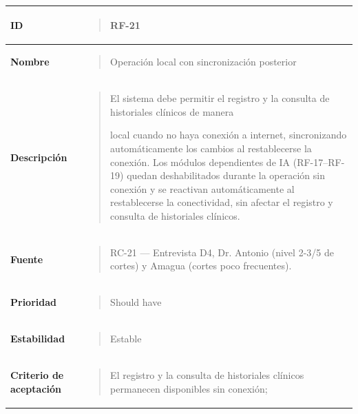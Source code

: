 \documentclass[
]{article}
\newcounter{none} %
\begin{document}
{\def\LTcaptype{none} %
\begin{longtable}[]{@{}
  >{\raggedright\arraybackslash}p{}
  >{\raggedright\arraybackslash}p{}@{}}
\toprule\noalign{}
\begin{minipage}[b]{\linewidth}\raggedright
\textbf{ID}
\end{minipage} & \begin{minipage}[b]{\linewidth}\raggedright
\begin{quote}
RF-21
\end{quote}
\end{minipage} \\
\midrule\noalign{}
\endhead
\bottomrule\noalign{}
\endlastfoot
\textbf{Nombre} & \begin{minipage}[t]{\linewidth}\raggedright
\begin{quote}
Operación local con sincronización posterior
\end{quote}
\end{minipage} \\
\textbf{Descripción} & \begin{minipage}[t]{\linewidth}\raggedright
\begin{quote}
El sistema debe permitir el registro y la consulta de historiales
clínicos de manera

local cuando no haya conexión a internet, sincronizando automáticamente
los cambios al restablecerse la conexión. Los módulos dependientes de IA
(RF-17--RF-19) quedan deshabilitados durante la operación sin conexión y
se reactivan automáticamente al restablecerse la conectividad, sin
afectar el registro y consulta de historiales clínicos.
\end{quote}
\end{minipage} \\
\textbf{Fuente} & \begin{minipage}[t]{\linewidth}\raggedright
\begin{quote}
RC-21 --- Entrevista D4, Dr. Antonio (nivel 2-3/5 de cortes) y Amagua
(cortes poco frecuentes).
\end{quote}
\end{minipage} \\
\textbf{Prioridad} & \begin{minipage}[t]{\linewidth}\raggedright
\begin{quote}
Should have
\end{quote}
\end{minipage} \\
\textbf{Estabilidad} & \begin{minipage}[t]{\linewidth}\raggedright
\begin{quote}
Estable
\end{quote}
\end{minipage} \\
\textbf{Criterio de aceptación} &
\begin{minipage}[t]{\linewidth}\raggedright
\begin{quote}
El registro y la consulta de historiales clínicos permanecen disponibles
sin conexión;


\end{quote}
\end{minipage}
\end{longtable}}
\end{document}

